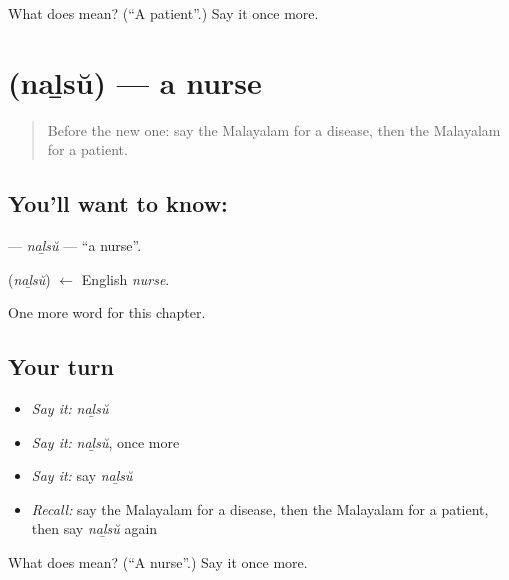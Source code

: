 \begin{tcolorbox}[breakable,colback=teal!4,colframe=teal!35!black,title={Before you move on}]
What does  mean? (\textquotedblleft{}A patient\textquotedblright{}.) Say it once more.
\end{tcolorbox}
\section[\texorpdfstring{\ml{നഴ്സ്} (naḻsŭ)}{നഴ്സ് (naḻsŭ)}]{ (naḻsŭ) — a nurse}

\label{lesson:ML-C312-nalsu}



\begin{quote}
Before the new one: say the Malayalam for a disease, then the Malayalam for a patient.
\end{quote}

\subsection*{You'll want to know: }
\textbf{} — \emph{naḻsŭ} — \textquotedblleft{}a nurse\textquotedblright{}.

\begin{cousinweb}
\textbf{} (\emph{naḻsŭ}) $\leftarrow$ English \emph{nurse}.
\end{cousinweb}

\begin{grammarlens}[title={What you've built}]
One more word for this chapter.
\end{grammarlens}

\subsection*{Your turn}
\begin{itemize}
\raggedright
  \item \emph{Say it:} \emph{naḻsŭ}
  \item \emph{Say it:} \emph{naḻsŭ}, once more
  \item \emph{Say it:} say \emph{naḻsŭ}
  \item \emph{Recall:} say the Malayalam for a disease, then the Malayalam for a patient, then say \emph{naḻsŭ} again
\end{itemize}

\begin{tcolorbox}[breakable,colback=teal!4,colframe=teal!35!black,title={Before you move on}]
What does  mean? (\textquotedblleft{}A nurse\textquotedblright{}.) Say it once more.
\end{tcolorbox}
